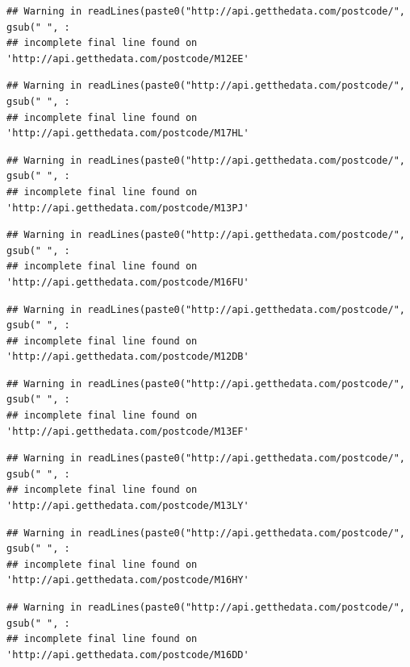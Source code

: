 \documentclass[]{book}
\begin{document}
\begin{verbatim}
## Warning in readLines(paste0("http://api.getthedata.com/postcode/", gsub(" ", :
## incomplete final line found on 'http://api.getthedata.com/postcode/M12EE'
\end{verbatim}

\begin{verbatim}
## Warning in readLines(paste0("http://api.getthedata.com/postcode/", gsub(" ", :
## incomplete final line found on 'http://api.getthedata.com/postcode/M17HL'
\end{verbatim}

\begin{verbatim}
## Warning in readLines(paste0("http://api.getthedata.com/postcode/", gsub(" ", :
## incomplete final line found on 'http://api.getthedata.com/postcode/M13PJ'
\end{verbatim}

\begin{verbatim}
## Warning in readLines(paste0("http://api.getthedata.com/postcode/", gsub(" ", :
## incomplete final line found on 'http://api.getthedata.com/postcode/M16FU'
\end{verbatim}

\begin{verbatim}
## Warning in readLines(paste0("http://api.getthedata.com/postcode/", gsub(" ", :
## incomplete final line found on 'http://api.getthedata.com/postcode/M12DB'
\end{verbatim}

\begin{verbatim}
## Warning in readLines(paste0("http://api.getthedata.com/postcode/", gsub(" ", :
## incomplete final line found on 'http://api.getthedata.com/postcode/M13EF'
\end{verbatim}

\begin{verbatim}
## Warning in readLines(paste0("http://api.getthedata.com/postcode/", gsub(" ", :
## incomplete final line found on 'http://api.getthedata.com/postcode/M13LY'
\end{verbatim}

\begin{verbatim}
## Warning in readLines(paste0("http://api.getthedata.com/postcode/", gsub(" ", :
## incomplete final line found on 'http://api.getthedata.com/postcode/M16HY'
\end{verbatim}

\begin{verbatim}
## Warning in readLines(paste0("http://api.getthedata.com/postcode/", gsub(" ", :
## incomplete final line found on 'http://api.getthedata.com/postcode/M16DD'
\end{verbatim}
\end{document}
